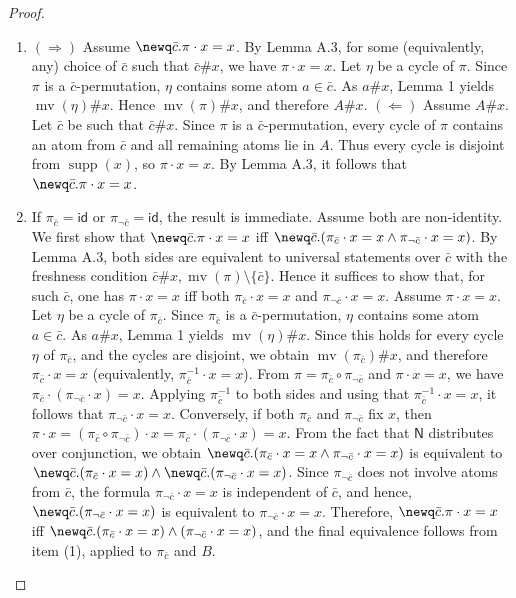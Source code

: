 \begin{proof}
\begin{enumerate}
\item $(\Rightarrow)$ Assume $\newq\bar c.\pi\cdot x=x$.
By Lemma A.3, for some (equivalently, any) choice of $\bar c$ such that $\bar c\#x$, we have $\pi\cdot x=x$.
Let $\eta$ be a cycle of $\pi$. Since $\pi$ is a $\bar c$-permutation, $\eta$ contains some atom $a\in\bar c$.
As $a\#x$, Lemma 1 yields $\operatorname{mv}(\eta)\#x$. Hence $\operatorname{mv}(\pi)\#x$, and therefore $A\#x$.
$(\Leftarrow)$ Assume $A\#x$. Let $\bar c$ be such that $\bar c\#x$.
Since $\pi$ is a $\bar c$-permutation, every cycle of $\pi$ contains an atom from $\bar c$ and all remaining atoms lie in $A$.
Thus every cycle is disjoint from $\operatorname{supp}(x)$, so $\pi\cdot x=x$.
By Lemma A.3, it follows that $\newq\bar c.\pi\cdot x=x$.
\item If $\pi_{\bar c}=\mathsf{id}$ or $\pi_{\neg\bar c}=\mathsf{id}$, the result is immediate. Assume both are non-identity.
We first show that $\newq\bar c.\pi\cdot x=x$ iff $\newq\bar c.(\pi_{\bar c}\cdot x=x\land\pi_{\neg\bar c}\cdot x=x)$.
By Lemma A.3, both sides are equivalent to universal statements over $\bar c$ with the freshness condition $\bar c\#x,\operatorname{mv}(\pi)\setminus\{\bar c\}$.
Hence it suffices to show that, for such $\bar c$, one has $\pi\cdot x=x$ iff both $\pi_{\bar c}\cdot x=x$ and $\pi_{\neg\bar c}\cdot x=x$.
Assume $\pi\cdot x=x$. Let $\eta$ be a cycle of $\pi_{\bar c}$. Since $\pi_{\bar c}$ is a $\bar c$-permutation, $\eta$ contains some atom $a\in\bar c$.
As $a\#x$, Lemma 1 yields $\operatorname{mv}(\eta)\#x$. Since this holds for every cycle $\eta$ of $\pi_{\bar c}$, and the cycles are disjoint, we obtain $\operatorname{mv}(\pi_{\bar c})\#x$, and therefore $\pi_{\bar c}\cdot x=x$ (equivalently, $\pi_{\bar c}^{-1}\cdot x=x$).
From $\pi=\pi_{\bar c}\circ\pi_{\neg\bar c}$ and $\pi\cdot x=x$, we have $\pi_{\bar c}\cdot(\pi_{\neg\bar c}\cdot x)=x$.
Applying $\pi_{\bar c}^{-1}$ to both sides and using that $\pi_{\bar c}^{-1}\cdot x=x$, it follows that $\pi_{\neg\bar c}\cdot x=x$.
Conversely, if both $\pi_{\bar c}$ and $\pi_{\neg\bar c}$ fix $x$, then $\pi\cdot x=(\pi_{\bar c}\circ\pi_{\neg\bar c})\cdot x=\pi_{\bar c}\cdot(\pi_{\neg\bar c}\cdot x)=x$.
From the fact that $\mathsf N$ distributes over conjunction, we obtain $\newq\bar c.(\pi_{\bar c}\cdot x=x\land\pi_{\neg\bar c}\cdot x=x)$ is equivalent to $\newq\bar c.(\pi_{\bar c}\cdot x=x)\land\newq\bar c.(\pi_{\neg\bar c}\cdot x=x)$.
Since $\pi_{\neg\bar c}$ does not involve atoms from $\bar c$, the formula $\pi_{\neg\bar c}\cdot x=x$ is independent of $\bar c$, and hence, $\newq\bar c.(\pi_{\neg\bar c}\cdot x=x)$ is equivalent to $\pi_{\neg\bar c}\cdot x=x$.
Therefore, $\newq\bar c.\pi\cdot x=x$ iff $\newq\bar c.(\pi_{\bar c}\cdot x=x)\land(\pi_{\neg\bar c}\cdot x=x)$, and the final equivalence follows from item (1), applied to $\pi_{\bar c}$ and $B$.
\end{enumerate}
\end{proof}

